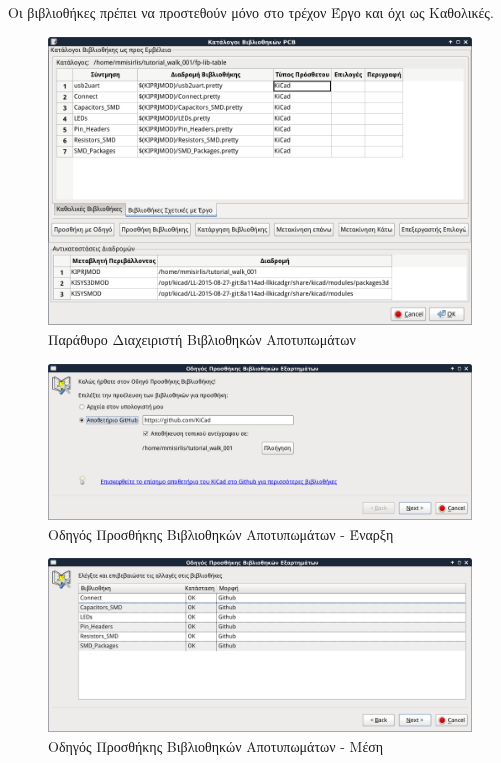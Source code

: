 \documentclass[a4paper]{article}
\begin{document}
Οι βιβλιοθήκες πρέπει να προστεθούν μόνο στο τρέχον Έργο και όχι ως Καθολικές.

\begin{figure}
  \begin{center}
    \includegraphics[width=.9\textwidth]{img/pcb-dial-libs.png}
    \caption{Παράθυρο Διαχειριστή Βιβλιοθηκών Αποτυπωμάτων}
    \label{fig:pcb-dial-libs}
  \end{center}
\end{figure}

\begin{figure}
  \begin{center}
    \includegraphics[width=.9\textwidth]{img/pcb-dial-libwiz.png}
    \caption{Οδηγός Προσθήκης Βιβλιοθηκών Αποτυπωμάτων - Έναρξη}
    \label{fig:pcb-dial-libwiz}
  \end{center}
\end{figure}

\begin{figure}
  \begin{center}
    \includegraphics[width=.9\textwidth]{img/pcb-dial-libwiz2.png}
    \caption{Οδηγός Προσθήκης Βιβλιοθηκών Αποτυπωμάτων - Μέση}
    \label{fig:pcb-dial-libwiz2}
  \end{center}
\end{figure}
\end{document}
